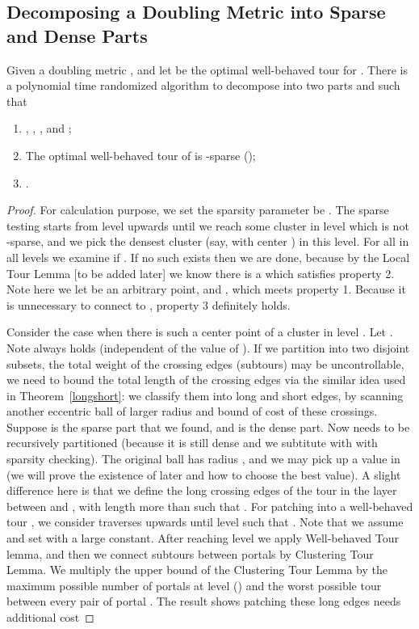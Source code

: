 \documentclass{llncs}
\begin{document}
\subsection{Decomposing a Doubling Metric into Sparse and Dense Parts}
\begin{lemma} 
Given a doubling metric , and let  be the optimal well-behaved tour for .
There is a polynomial time randomized algorithm to decompose  into two parts  and  such that
\begin{enumerate}
\item , , , and ;
\item The optimal well-behaved tour of  is -sparse ();
\item . 
\end{enumerate}
\end{lemma}
\begin{proof}
For calculation purpose, we set the sparsity parameter  be .
The sparse testing starts from level  upwards until we reach some cluster in level  which is not -sparse, and we pick the densest cluster (say, with center ) in this level.
For all  in all levels  we examine if .
If no such  exists then we are done, because by the Local Tour Lemma [to be added later] we know there is a  which satisfies property 2.
Note here we let  be an arbitrary point, and , which meets property 1.
Because it is unnecessary to connect  to , property 3 definitely holds.

Consider the case when there is such a center point  of a cluster in level .
Let .
Note  always holds (independent of the value of ).
If we partition  into two disjoint subsets, the total weight of the crossing edges (subtours) may be uncontrollable, we need to bound the total length of the crossing edges via the similar idea used in Theorem~\ref{longshort}: we classify them into long and short edges, by scanning another eccentric ball of larger radius and bound of cost of these crossings.
Suppose  is the sparse part that we found, and  is the dense part.
Now  needs to be recursively partitioned (because it is still dense and we subtitute  with  with sparsity checking).
The original ball has radius , and we may pick up a value  in (we will prove the existence of  later and how to choose the best value).
A slight difference here is that we define the long crossing edges of the tour  in the layer between  and , with length more than  such that .
For patching into a well-behaved tour , we consider  traverses upwards until level  such that .
Note that we assume  and set  with a large constant.
After reaching level  we apply Well-behaved Tour lemma, and then we connect subtours between portals by Clustering Tour Lemma.
We multiply the upper bound of the Clustering Tour Lemma  by the maximum possible number of portals at level  () and the worst possible tour between every pair of portal .
The result shows patching these long edges needs additional cost


\end{proof}
\end{document}

